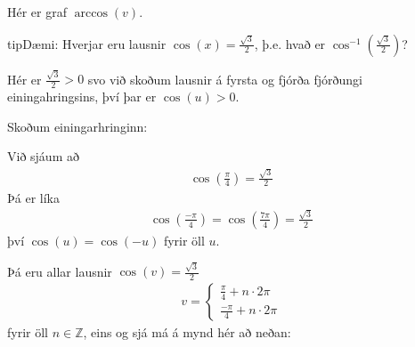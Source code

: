 \documentclass[a4paper,10pt,icelandic]{sphinxmanual}
\begin{document}

Hér er graf \(\arccos(v)\).

\begin{sphinxadmonition}{tip}{Dæmi:}
Hverjar eru lausnir \(\cos(x)=\frac{\sqrt{3}}{2}\), þ.e. hvað er \(\cos^{-1}\left( \frac{\sqrt{3}}{2} \right)\)?

Hér er \(\frac{\sqrt{3}}{2} >0\) svo við skoðum lausnir á fyrsta og fjórða fjórðungi einingahringsins, því þar er \(\cos(u)>0\).

Skoðum einingarhringinn:

\begin{figure}[H]
\centering

\noindent{}
\end{figure}

Við sjáum að
\begin{equation*}
\begin{split}\cos\left(\frac{\pi}{4}\right)= \frac{\sqrt{3}}{2}\end{split}
\end{equation*}
Þá er líka
\begin{equation*}
\begin{split}\cos\left(\frac{-\pi}{4}\right) = \cos\left(\frac{7\pi}{4}\right) = \frac{\sqrt{3}}{2}\end{split}
\end{equation*}
því \(\cos(u) = \cos(-u)\) fyrir öll \(u\).

Þá eru allar lausnir \(\cos(v)=\frac{\sqrt{3}}{2}\)
\begin{equation*}
\begin{split}v =
\begin{cases}
\frac{\pi}{4} + n\cdot 2\pi \\
\frac{-\pi}{4} + n \cdot 2\pi
\end{cases}\end{split}
\end{equation*}
fyrir öll \(n \in \mathbb{Z}\), eins og sjá má á mynd hér að neðan:

\end{sphinxadmonition}
\end{document}

